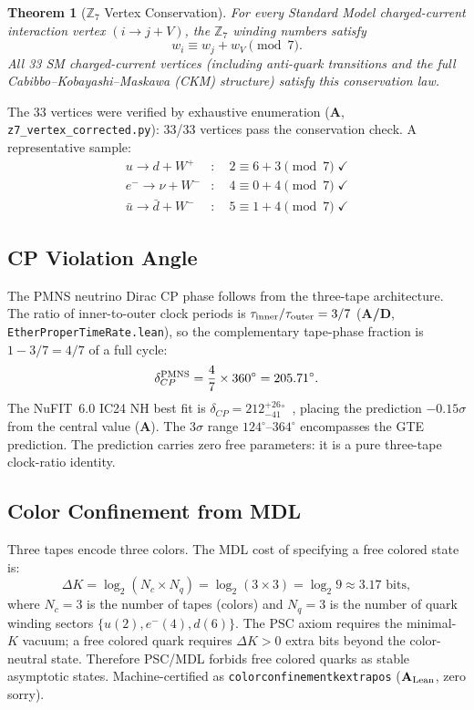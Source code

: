 \documentclass[11pt]{article}
\newtheorem{theorem}{Theorem}[section]
\theoremstyle{remark}
\newcommand{\PSC}{\text{PSC}}
\newcommand{\ZS}{\mathbb{Z}_7}
\newcommand{\lean}[1]{%
  \penalty-100
  \begingroup\def\_{\textunderscore\allowbreak}\texttt{#1}\endgroup}
\newcommand{\CatA}{\textbf{A}}
\newcommand{\CatAL}{\ensuremath{\textbf{A}_{\rm Lean}}}
\newcommand{\CatAD}{\textbf{A/D}}
\begin{document}
\begin{theorem}[$\ZS$ Vertex Conservation]
\label{thm:vertex}
For every Standard Model charged-current interaction vertex
$(i \to j + V)$, the $\ZS$ winding numbers satisfy
\[
  w_i \equiv w_j + w_V \pmod{7}.
\]
All 33 SM charged-current vertices (including anti-quark transitions and
the full Cabibbo--Kobayashi--Maskawa (CKM) structure) satisfy this conservation law.
\end{theorem}

The 33 vertices were verified by exhaustive enumeration ($\CatA$,
\texttt{z7\_vertex\_corrected.py}): 33/33 vertices pass the conservation
check. A representative sample:
\begin{align*}
  u \to d + W^+ &: \quad 2 \equiv 6 + 3 \pmod{7} \;\checkmark \\
  e^- \to \nu + W^- &: \quad 4 \equiv 0 + 4 \pmod{7} \;\checkmark \\
  \bar{u} \to \bar{d} + W^- &: \quad 5 \equiv 1 + 4 \pmod{7} \;\checkmark
\end{align*}

\subsection{CP Violation Angle}

The PMNS neutrino Dirac CP phase follows from the three-tape architecture.
The ratio of inner-to-outer clock periods is $\tau_{\rm inner}/\tau_{\rm outer} = 3/7$
(\CatAD, \texttt{EtherProperTimeRate.lean}), so the complementary tape-phase
fraction is $1 - 3/7 = 4/7$ of a full cycle:
\begin{equation}
  \delta_{CP}^{\rm PMNS} = \frac{4}{7} \times 360{\ensuremath{{}^\circ}}
  = 205.71{\ensuremath{{}^\circ}}.
\end{equation}
The NuFIT~6.0 IC24 NH best fit is $\delta_{CP} = 212^{+26}_{-41}{}^\circ$~\cite{NuFIT60},
placing the prediction $-0.15\sigma$ from the central value ($\CatA$).
The $3\sigma$ range $124^\circ$--$364^\circ$ encompasses the GTE prediction.
The prediction carries zero free parameters: it is a pure three-tape clock-ratio identity.

\subsection{Color Confinement from MDL}

Three tapes encode three colors. The MDL cost of specifying a free colored
state is:
\begin{equation}
  \Delta K = \log_2(N_c \times N_q) = \log_2(3 \times 3) = \log_2 9
  \approx 3.17 \text{ bits},
\end{equation}
where $N_c = 3$ is the number of tapes (colors) and $N_q = 3$ is the
number of quark winding sectors $\{u(2), e^-(4), d(6)\}$. The $\PSC$
axiom requires the minimal-$K$ vacuum; a free colored quark requires
$\Delta K > 0$ extra bits beyond the color-neutral state. Therefore
PSC/MDL forbids free colored quarks as stable asymptotic states.
Machine-certified as \lean{color\_confinement\_k\_extra\_pos}
($\CatAL$, zero sorry).
\end{document}
